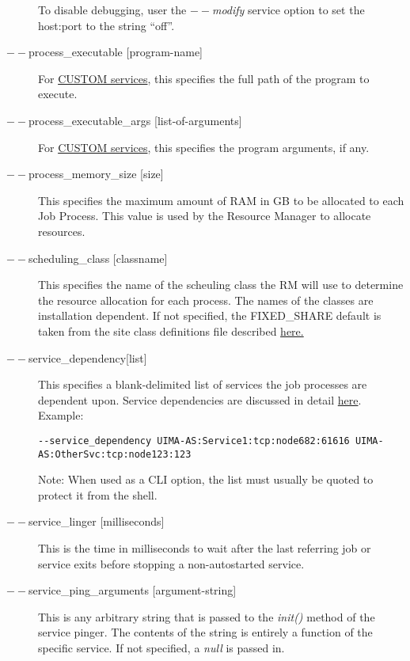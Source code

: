 \begin{description}
        To disable debugging, user the {\em $--$modify} service option to set the host:port to
        the string ``off''.

      \item[$--$process\_executable {[program-name]}] For \hyperref[sec:services.types]{CUSTOM
          services}, this specifies the full path of the program to execute.

      \item[$--$process\_executable\_args {[list-of-arguments]}] For \hyperref[sec:services.types]{CUSTOM
          services}, this specifies the program arguments, if any.

      \item[$--$process\_memory\_size {[size]}] This specifies the maximum amount of RAM in GB to be
        allocated to each Job Process.  This value is used by the Resource Manager to allocate
        resources. 

      \item[$--$scheduling\_class {[classname]}] This specifies the name of the scheuling class the RM
        will use to determine the resource allocation for each process. The names of the classes are
        installation dependent. If not specified, the FIXED\_SHARE default is taken from the site class
        definitions file described \hyperref[subsubsec:class.configuration]{here.}

      \item[$--$service\_dependency{[list]}] This specifies a blank-delimited list of services the job
        processes are dependent upon. Service dependencies are discussed in detail
        \hyperref[sec:service.endpoints]{here}. Example:
\begin{verbatim}
--service_dependency UIMA-AS:Service1:tcp:node682:61616 UIMA-AS:OtherSvc:tcp:node123:123 
\end{verbatim}

        Note: When used as a CLI option, the list must usually be
        quoted to protect it from the shell.
          

      \item[$--$service\_linger {[milliseconds]}] This is the time in milliseconds to wait after the last
        referring job or service exits before stopping a non-autostarted service.

      \item[$--$service\_ping\_arguments {[argument-string]}] This is any arbitrary string
        that is passed to the {\em init()} method of the service pinger.  The contents of
        the string is entirely a function of the specific service.  If not specified,
        a {\em null} is passed in.


\end{description}
